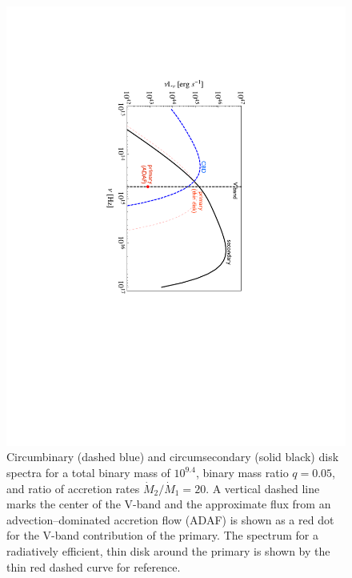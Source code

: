 \begin{figure}
\hspace{-1in}
\includegraphics[scale=0.9,angle=90]{figures/ch4/figMethods1.pdf} 
\vspace{-1in}
\caption{
 Circumbinary
(dashed blue) and circumsecondary (solid black) disk spectra for a
total binary mass of $10^{9.4}$, binary mass ratio $q=0.05$, and ratio
of accretion rates $\dot{M}_2/\dot{M}_1 = 20$.  A vertical dashed line
marks the center of the V-band and the approximate flux from an
advection--dominated accretion flow (ADAF) is shown as a red dot for
the V-band contribution of the primary.  The spectrum for a
radiatively efficient, thin disk around the primary is shown by the
thin red dashed curve for reference.
}
\label{Fig:3DiskSpectra}
\end{figure}



